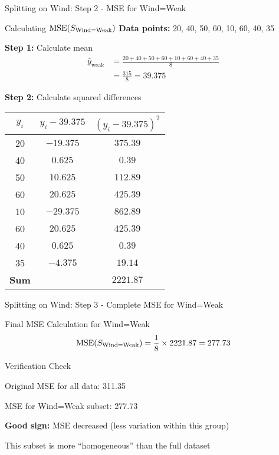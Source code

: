 \documentclass[usenames,dvipsnames]{beamer}
\begin{document}
\begin{frame}{Splitting on Wind: Step 2 - MSE for Wind=Weak}
\small
\begin{examplebox}{Calculating $\operatorname{MSE}(S_{\text{Wind=Weak}})$}
\textbf{Data points:} 20, 40, 50, 60, 10, 60, 40, 35

\pause
\textbf{Step 1:} Calculate mean
\begin{align*}
\bar{y}_{\text{weak}} &= \frac{20 + 40 + 50 + 60 + 10 + 60 + 40 + 35}{8} \\
&= \frac{315}{8} = 39.375    
\end{align*}

\pause
\textbf{Step 2:} Calculate squared differences
\scriptsize
\begin{center}
\begin{tabular}{|c|c|c|}
\hline
$y_i$ & $y_i - 39.375$ & $(y_i - 39.375)^2$ \\ \hline
20 & $-19.375$ & $375.39$ \\
40 & $0.625$ & $0.39$ \\
50 & $10.625$ & $112.89$ \\
60 & $20.625$ & $425.39$ \\
10 & $-29.375$ & $862.89$ \\
60 & $20.625$ & $425.39$ \\
40 & $0.625$ & $0.39$ \\
35 & $-4.375$ & $19.14$ \\ \hline
\textbf{Sum} & & $\mathbf{2221.87}$ \\
\hline
\end{tabular}
\end{center}
\end{examplebox}
\end{frame}

\begin{frame}{Splitting on Wind: Step 3 - Complete MSE for Wind=Weak}
\begin{examplebox}{Final MSE Calculation for Wind=Weak}
\[
\operatorname{MSE}(S_{\text{Wind=Weak}}) = \frac{1}{8} \times 2221.87 = 277.73
\]
\end{examplebox}

\pause
\begin{examplebox}{Verification Check}
\cleanitemize
{
    \item Original MSE for all data: 311.35
    \item MSE for Wind=Weak subset: 277.73
    \item \textbf{Good sign:} MSE decreased (less variation within this group)
    \item This subset is more ``homogeneous'' than the full dataset
}
\end{examplebox}
\end{frame}
\end{document}
